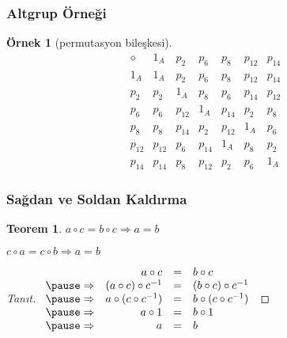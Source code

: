 \documentclass[dvipsnames]{beamer}
\theoremstyle{definition}
\theoremstyle{example}
\newtheorem{ornek}[theorem]{Örnek}
\theoremstyle{plain}
\newtheorem{teorem}[theorem]{Teorem}
\begin{document}
\begin{frame}
  \frametitle{Altgrup Örneği}

  \begin{ornek}[permutasyon bileşkesi]
    \[
      \begin{array}{c||c|c|c|c|c|c}
        \diamond & 1_{A}  & p_{2}  & p_{6}  & p_{8}  & p_{12} & p_{14}\\\hline\hline
        1_{A}    & 1_{A}  & p_{2}  & p_{6}  & p_{8}  & p_{12} & p_{14}\\\hline
        p_{2}    & p_{2}  & 1_{A}  & p_{8}  & p_{6}  & p_{14} & p_{12}\\\hline
        p_{6}    & p_{6}  & p_{12} & 1_{A}  & p_{14} & p_{2}  & p_{8}\\\hline
        p_{8}    & p_{8}  & p_{14} & p_{2}  & p_{12} & 1_{A}  & p_{6}\\\hline
        p_{12}   & p_{12} & p_{6}  & p_{14} & 1_{A}  & p_{8}  & p_{2}\\\hline
        p_{14}   & p_{14} & p_{8}  & p_{12} & p_{2}  & p_{6}  & 1_{A}
      \end{array}
    \]
  \end{ornek}
\end{frame}

\begin{frame}
  \frametitle{Sağdan ve Soldan Kaldırma}

  \begin{teorem}
    $a \circ c = b \circ c \Rightarrow a = b$

    $c \circ a = c \circ b \Rightarrow a = b$
  \end{teorem}

  \pause
  \begin{proof}[Tanıt]
    $\begin{array}{crcl}
                  & a \circ c                & = & b \circ c\\ \pause
      \Rightarrow & (a \circ c) \circ c^{-1} & = & (b \circ c) \circ c^{-1}\\ \pause
      \Rightarrow & a \circ (c \circ c^{-1}) & = & b \circ (c \circ c^{-1})\\ \pause
      \Rightarrow & a \circ 1                & = & b \circ 1\\ \pause
      \Rightarrow & a                        & = & b
    \end{array}$

  \end{proof}
\end{frame}
\end{document}
